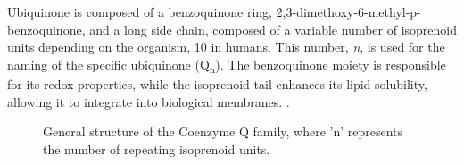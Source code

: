 Ubiquinone is composed of a benzoquinone ring, 2,3-dimethoxy-6-methyl-p-benzoquinone, and a long side chain, composed of a variable number of isoprenoid units depending on the organism, 10 in humans. This number, \textit{n}, is used for the naming of the specific ubiquinone (Q\textsubscript{n}). The benzoquinone moiety is responsible for its redox properties, while the isoprenoid tail enhances its lipid solubility, allowing it to integrate into biological membranes. \cite{ernster1995biochemical}.

\begin{figure}[h!]
    \centering
    \caption{General structure of the Coenzyme Q family, where 'n' represents the number of repeating isoprenoid units.}
    \label{fig:coenzyme_q_family}
\end{figure}

